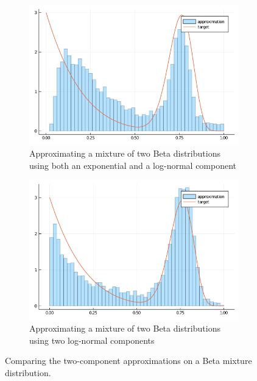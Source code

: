 \begin{figure}[H]
\centering
\begin{subfigure}{0.45\textwidth}
\includegraphics[width=1\linewidth]{../../plot/both_multiple.png}
\caption{Approximating a mixture of two Beta distributions using both an exponential and a log-normal component}
\end{subfigure}
\begin{subfigure}{0.45\textwidth}
\includegraphics[width=1\linewidth]{../../plot/gauss_multiple.png}
\caption{Approximating a mixture of two Beta distributions using two log-normal components}
\end{subfigure}
\caption{Comparing the two-component approximations on a Beta mixture distribution.}
\label{fig:extension.multiple}
\end{figure}